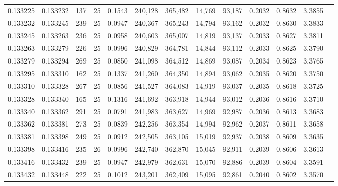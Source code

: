 \begin{tabular}{rrrrrrrrrrrrr}
0.133225 & 0.133232 &   137 &  25 &                                     0.1543 & 240,128 & 365,482 &  14,769 &  93,187 & 0.2032 & 0.8632 & 3.3855 \\
0.133232 & 0.133245 &   239 &  25 &                                     0.0947 & 240,367 & 365,243 &  14,794 &  93,162 & 0.2032 & 0.8630 & 3.3833 \\
0.133245 & 0.133263 &   236 &  25 &                                     0.0958 & 240,603 & 365,007 &  14,819 &  93,137 & 0.2033 & 0.8627 & 3.3811 \\
0.133263 & 0.133279 &   226 &  25 &                                     0.0996 & 240,829 & 364,781 &  14,844 &  93,112 & 0.2033 & 0.8625 & 3.3790 \\
0.133279 & 0.133294 &   269 &  25 &                                     0.0850 & 241,098 & 364,512 &  14,869 &  93,087 & 0.2034 & 0.8623 & 3.3765 \\
0.133295 & 0.133310 &   162 &  25 &                                     0.1337 & 241,260 & 364,350 &  14,894 &  93,062 & 0.2035 & 0.8620 & 3.3750 \\
0.133310 & 0.133328 &   267 &  25 &                                     0.0856 & 241,527 & 364,083 &  14,919 &  93,037 & 0.2035 & 0.8618 & 3.3725 \\
0.133328 & 0.133340 &   165 &  25 &                                     0.1316 & 241,692 & 363,918 &  14,944 &  93,012 & 0.2036 & 0.8616 & 3.3710 \\
0.133340 & 0.133362 &   291 &  25 &                                     0.0791 & 241,983 & 363,627 &  14,969 &  92,987 & 0.2036 & 0.8613 & 3.3683 \\
0.133362 & 0.133381 &   273 &  25 &                                     0.0839 & 242,256 & 363,354 &  14,994 &  92,962 & 0.2037 & 0.8611 & 3.3658 \\
0.133381 & 0.133398 &   249 &  25 &                                     0.0912 & 242,505 & 363,105 &  15,019 &  92,937 & 0.2038 & 0.8609 & 3.3635 \\
0.133398 & 0.133416 &   235 &  26 &                                     0.0996 & 242,740 & 362,870 &  15,045 &  92,911 & 0.2039 & 0.8606 & 3.3613 \\
0.133416 & 0.133432 &   239 &  25 &                                     0.0947 & 242,979 & 362,631 &  15,070 &  92,886 & 0.2039 & 0.8604 & 3.3591 \\
0.133432 & 0.133448 &   222 &  25 &                                     0.1012 & 243,201 & 362,409 &  15,095 &  92,861 & 0.2040 & 0.8602 & 3.3570 \\

\end{tabular}
